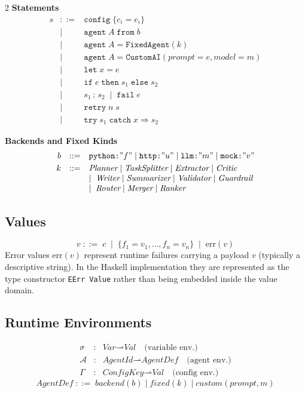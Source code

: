 \documentclass[10pt]{article}
\newcommand{\A}{\mathcal{A}}
\newcommand{\err}[1]{\mathrm{err}(#1)}
\newcommand{\backend}{\mathit{backend}}
\newcommand{\fixed}{\mathit{fixed}}
\newcommand{\custom}{\mathit{custom}}
\begin{document}
\begin{multicols}{2}
\medskip
\noindent\textbf{Statements}
\[
\begin{array}{rcl}
s & ::= & \texttt{config}\;\{c_i{=}e_i\} \\
  & \mid & \texttt{agent}\;A\;\texttt{from}\;b \\
  & \mid & \texttt{agent}\;A = \texttt{FixedAgent}(k) \\
  & \mid & \texttt{agent}\;A = \texttt{CustomAI}(\textit{prompt}{=}e,\textit{model}{=}m)\\
  & \mid & \texttt{let}\;x = e \\
  & \mid & \texttt{if}\;e\;\texttt{then}\;s_1\;\texttt{else}\;s_2 \\
  & \mid & s_1\,;\,s_2 \;\mid\; \texttt{fail}\;e \\
  & \mid & \texttt{retry}\;n\;s \\
  & \mid & \texttt{try}\;s_1\;\texttt{catch}\;x \Rightarrow s_2
\end{array}
\]

\noindent\textbf{Backends and Fixed Kinds}
\[
\begin{array}{rcl}
b & ::= & \texttt{python:}"f" \mid \texttt{http:}"u"
    \mid \texttt{llm:}"m" \mid \texttt{mock:}"v"\\[3pt]
k & ::= & \textit{Planner} \mid \textit{TaskSplitter}
    \mid \textit{Extractor} \mid \textit{Critic} \\
  &     & \mid\;\textit{Writer} \mid \textit{Summarizer}
    \mid \textit{Validator} \mid \textit{Guardrail} \\
  &     & \mid\;\textit{Router} \mid \textit{Merger} \mid \textit{Ranker}
\end{array}
\]

\subsection{Values}
\[
v \;::=\; c \;\mid\; \{f_1{=}v_1,\ldots,f_n{=}v_n\}
         \;\mid\; \err{v}
\]
Error values $\err{v}$ represent runtime failures carrying a payload $v$
(typically a descriptive string).  In the Haskell implementation they are
represented as the type constructor \texttt{EErr Value} rather than being
embedded inside the value domain.

\subsection{Runtime Environments}
\[
\begin{array}{rcl}
\sigma & : & \textit{Var} \rightharpoonup \textit{Val}
  \quad\text{(variable env.)} \\[2pt]
\A     & : & \textit{AgentId} \rightharpoonup \textit{AgentDef}
  \quad\text{(agent env.)} \\[2pt]
\Gamma & : & \textit{ConfigKey} \rightharpoonup \textit{Val}
  \quad\text{(config env.)}
\end{array}
\]
\[
\textit{AgentDef} \;::=\; \backend(b)
  \mid \fixed(k)
  \mid \custom(\textit{prompt},m)
\]


\end{multicols}
\end{document}
